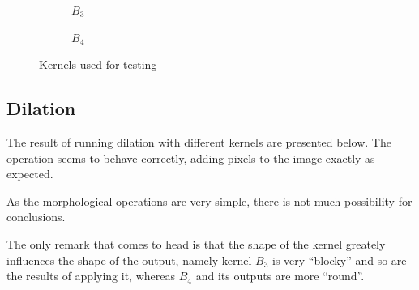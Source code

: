 \documentclass[12pt]{article}
\begin{document}
\begin{figure}[H]
\begin{subfigure}[t]{.2\textwidth}
        \caption{$B_3$}
    \end{subfigure}
    \begin{subfigure}[t]{.2\textwidth}\centering
        \caption{$B_4$}
    \end{subfigure}
    \caption{Kernels used for testing}
\end{figure}

\subsection{Dilation}

The result of running dilation with different kernels are presented below.
The operation seems to behave correctly,
adding pixels to the image exactly as expected.

As the morphological operations are very simple, there is not much possibility for conclusions.

The only remark that comes to head is that the shape of the kernel greately influences the shape of the output,
namely kernel $B_3$ is very ``blocky'' and so are the results of applying it, whereas $B_4$ and its outputs are more ``round''.
\end{document}
